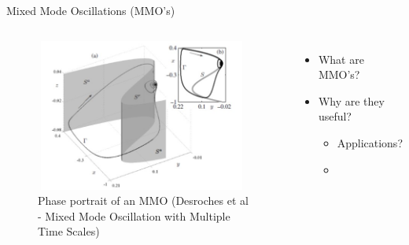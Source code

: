 \documentclass[11pt]{beamer}
\begin{document}
\begin{frame}{Mixed Mode Oscillations (MMO's)}
\begin{columns}
	\begin{figure}
		
		\includegraphics[height=5cm,width=7cm]{Images/phase-MMO}
		\caption{Phase portrait of an MMO (Desroches et al - Mixed Mode Oscillation with Multiple Time Scales)}
		
	\end{figure}
	\begin{itemize}
		\item What are MMO's?
		\item Why are they useful?
		\begin{itemize}
			\item Applications? 
			\item 
		\end{itemize}
		
	\end{itemize}
\end{columns}
\end{frame}
\end{document}
